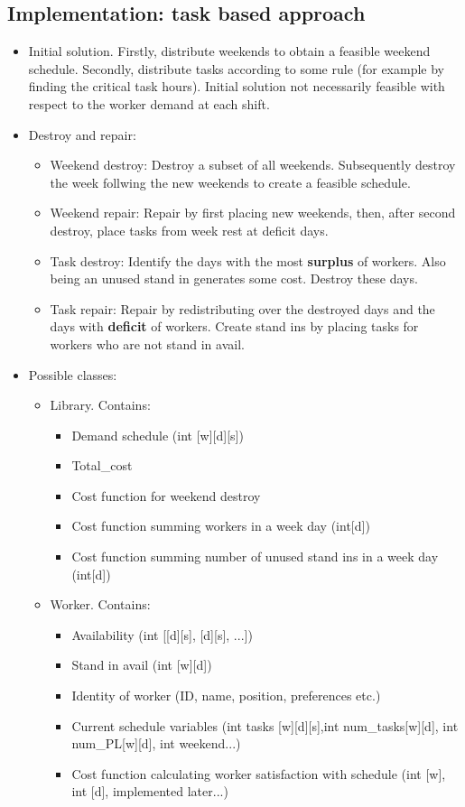 \documentclass{article}
\begin{document}
	\subsection*{Implementation: task based approach} 
	\begin{itemize}
	\item Initial solution. Firstly, distribute weekends to obtain a feasible weekend schedule. Secondly, distribute tasks according to some rule (for example by finding  the critical task hours). Initial solution not necessarily feasible with respect to the worker demand at each shift.
	\item Destroy and repair: 
		\begin{itemize}
		\item Weekend destroy: Destroy a subset of all weekends. Subsequently destroy the week follwing the new weekends to create a feasible schedule.
		\item Weekend repair: Repair by first placing new weekends, then, after second destroy, place tasks from week rest at deficit days.
		\item Task destroy: Identify the days with the most \textbf{surplus} of workers. Also being an unused stand in generates some cost. Destroy these days.
		\item Task repair: Repair by redistributing over the destroyed days and the days with \textbf{deficit} of workers. Create stand ins by placing tasks for workers who are not stand in avail.
		\end{itemize}
	\item Possible classes:
		\begin{itemize}
		\item Library. Contains:
		\begin{itemize}
			\item Demand schedule (int [w][d][s])
			\item Total\_cost
			\item Cost function for weekend destroy 
			\item Cost function summing workers in a week day (int[d])
			\item Cost function summing number of unused stand ins in a week day (int[d])
			
		\end{itemize} 
		\item Worker. Contains:
		\begin{itemize}
				\item Availability (int [[d][s], [d][s], ...])
				\item Stand in avail (int [w][d])
				\item Identity of worker (ID, name, position, preferences etc.)
				\item Current schedule variables (int tasks [w][d][s],int num\_tasks[w][d], int num\_PL[w][d], int weekend...)
				\item Cost function calculating worker satisfaction with schedule (int [w], int [d], implemented later...)
		\end{itemize} 
		\end{itemize}
	\end{itemize}
	
\end{document}
